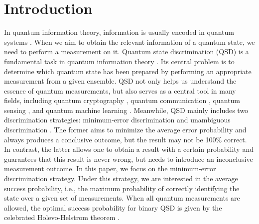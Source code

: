 \documentclass[aps,pra,twocolumn,floatfix,amsfonts,10pt]{revtex4-2}
\begin{document}
\section{Introduction}
In quantum information theory, information is usually encoded in quantum systems \cite{NC2011}. 
When we aim to obtain the relevant information of a quantum state, we need to perform a measurement on it. 
Quantum state discrimination (QSD) is a fundamental task in quantum information theory \cite{BC2009,BK2015}. 
Its central problem is to determine which quantum state has been prepared by performing an appropriate measurement from a given ensemble. 
QSD not only helps us understand the essence of quantum measurements, but also serves as a central tool in many fields, including quantum cryptography \cite{GRT+2002}, quantum communication \cite{GT2007}, quantum sensing \cite{DRC2017}, and quantum machine learning \cite{BWP+2017}.
Meanwhile, QSD mainly includes two discrimination strategies: minimum-error discrimination \cite{H1969,H1973} and unambiguous discrimination \cite{C2001,FDY2004}. 
The former aims to minimize the average error probability and always produces a conclusive outcome, but the result may not be 100\% correct. 
In contrast, the latter allows one to obtain a result with a certain probability and guarantees that this result is never wrong, but needs to introduce an inconclusive measurement outcome.
In this paper, we focus on the minimum-error discrimination strategy. 
Under this strategy, we are interested in the average success probability, i.e., the maximum probability of correctly identifying the state over a given set of measurements. 
When all quantum measurements are allowed, the optimal success probability for binary QSD is given by the celebrated Holevo-Helstrom theorem \cite{H1969,H1973}. 
\end{document}
